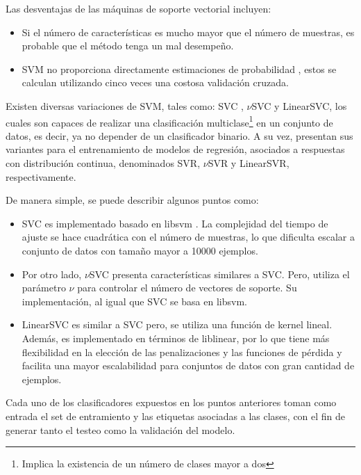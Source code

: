 Las desventajas de las máquinas de soporte vectorial incluyen:

\begin{itemize}
	
	\item Si el número de características es mucho mayor que el número de muestras, es probable que
	el método tenga un mal desempeño.
	\item SVM no proporciona directamente estimaciones de probabilidad \cite{wu2004probability}, estos se calculan utilizando cinco veces una costosa validación cruzada.
	
\end{itemize}

Existen diversas variaciones de SVM, tales como: SVC \cite{guyon1993automatic}, $\nu$SVC y LinearSVC, los cuales son capaces de realizar una clasificación multiclase\footnote{Implica la existencia de un número de clases mayor a dos} en un conjunto de datos, es decir, ya no depender de un clasificador binario. A su vez, presentan sus variantes para el entrenamiento de modelos de regresión, asociados a respuestas con distribución continua, denominados SVR, $\nu$SVR y LinearSVR, respectivamente.

De manera simple, se puede describir algunos puntos como:

\begin{itemize}

	\item SVC es implementado basado en libsvm \cite{chang2011libsvm}. La complejidad del tiempo de ajuste se hace cuadrática con el número de muestras, lo que dificulta escalar a conjunto de datos con tamaño mayor a 10000 ejemplos.

	\item Por otro lado, $\nu$SVC presenta características similares a SVC. Pero, utiliza el parámetro $\nu$ para controlar el número de vectores de soporte. Su implementación, al igual que SVC se basa en libsvm.

	\item LinearSVC es similar a SVC pero, se utiliza una función de kernel lineal. Además, es implementado en términos de liblinear, por lo que tiene más flexibilidad en la elección de las penalizaciones y las funciones de pérdida y facilita una mayor escalabilidad para conjuntos de datos con gran cantidad de ejemplos.
	
\end{itemize}


Cada uno de los clasificadores expuestos en los puntos anteriores toman como entrada el set de entramiento y las etiquetas asociadas a las clases, con el fin de generar tanto el testeo como la validación del modelo.

